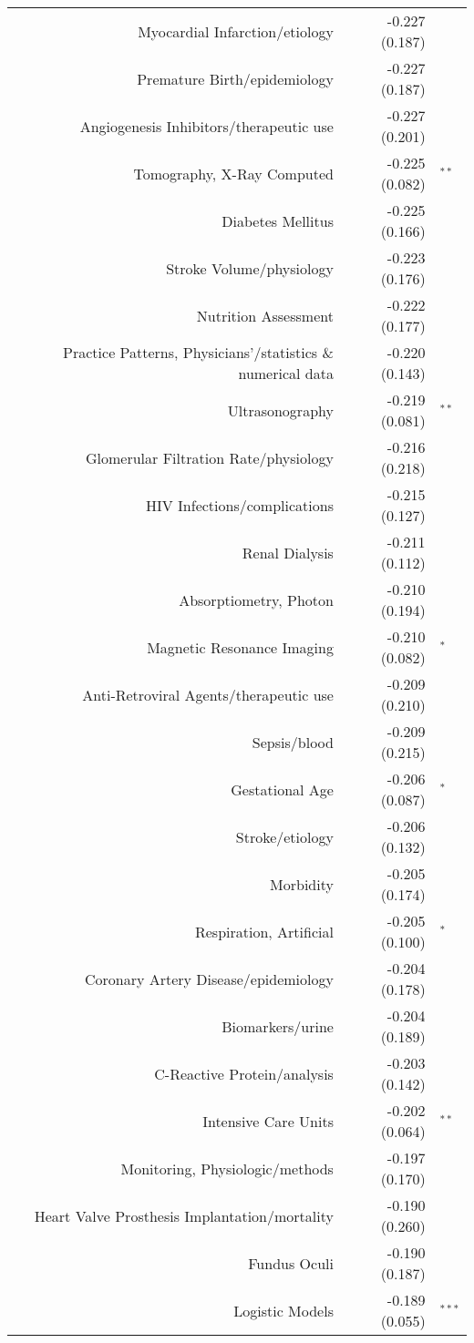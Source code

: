\begin{longtable}[l]{rr@{}l@{ }}
Myocardial Infarction/etiology & -0.227 (0.187) & $^{}$\\
Premature Birth/epidemiology & -0.227 (0.187) & $^{}$\\
Angiogenesis Inhibitors/therapeutic use & -0.227 (0.201) & $^{}$\\
Tomography, X-Ray Computed & -0.225 (0.082) & $^{**}$\\
Diabetes Mellitus & -0.225 (0.166) & $^{}$\\
Stroke Volume/physiology & -0.223 (0.176) & $^{}$\\
Nutrition Assessment & -0.222 (0.177) & $^{}$\\
Practice Patterns, Physicians'/statistics \& numerical data & -0.220 (0.143) & $^{}$\\
Ultrasonography & -0.219 (0.081) & $^{**}$\\
Glomerular Filtration Rate/physiology & -0.216 (0.218) & $^{}$\\
HIV Infections/complications & -0.215 (0.127) & $^{}$\\
Renal Dialysis & -0.211 (0.112) & $^{}$\\
Absorptiometry, Photon & -0.210 (0.194) & $^{}$\\
Magnetic Resonance Imaging & -0.210 (0.082) & $^{*}$\\
Anti-Retroviral Agents/therapeutic use & -0.209 (0.210) & $^{}$\\
Sepsis/blood & -0.209 (0.215) & $^{}$\\
Gestational Age & -0.206 (0.087) & $^{*}$\\
Stroke/etiology & -0.206 (0.132) & $^{}$\\
Morbidity & -0.205 (0.174) & $^{}$\\
Respiration, Artificial & -0.205 (0.100) & $^{*}$\\
Coronary Artery Disease/epidemiology & -0.204 (0.178) & $^{}$\\
Biomarkers/urine & -0.204 (0.189) & $^{}$\\
C-Reactive Protein/analysis & -0.203 (0.142) & $^{}$\\
Intensive Care Units & -0.202 (0.064) & $^{**}$\\
Monitoring, Physiologic/methods & -0.197 (0.170) & $^{}$\\
Heart Valve Prosthesis Implantation/mortality & -0.190 (0.260) & $^{}$\\
Fundus Oculi & -0.190 (0.187) & $^{}$\\
Logistic Models & -0.189 (0.055) & $^{***}$\\

\end{longtable}
